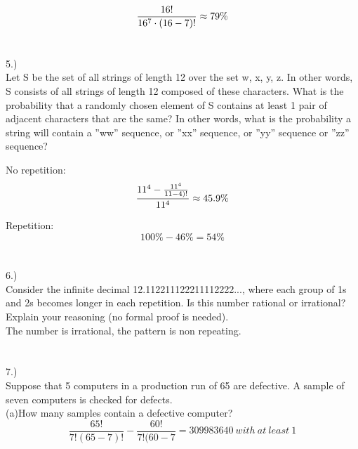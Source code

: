\documentclass[fleqn]{article}
\begin{document}
\begin{equation*}
  \frac{16!}{16^7 \cdot (16-7)!} \approx 79\%\\
\end{equation*}


\section*{}
5.)\\
Let S be the set of all strings of length 12 over the set {w, x, y, z}. 
In other words, S consists of all strings of
length 12 composed of these characters. What is the probability that 
a randomly chosen element of S contains at least 1 pair of adjacent 
characters that are the same? In other words, what is the probability a
string will contain a ”ww” sequence, or ”xx” sequence, or
”yy” sequence or ”zz” sequence?

No repetition:
\begin{equation*}
  \frac{11^4 - \frac{11^4}{11-4)!}}{11^4} \approx 45.9\% \\
\end{equation*}

Repetition:\\

\begin{equation*}
  100\%-46\%=54\%
\end{equation*}


 \section*{}
 6.) \\
Consider the infinite decimal 12.112211122211112222..., where each group 
of 1s and 2s becomes longer in each repetition. Is this number rational
or irrational? Explain your reasoning (no formal proof is needed).
\\
The number is irrational, the pattern is non repeating.

\section*{}
7.)\\
Suppose that 5 computers in a production run of 65 are defective. A sample of
seven computers is checked for defects.\\
(a)How many samples contain a defective computer?
\begin{equation*} 
  \frac{65!}{7!(65-7)!} - \frac{60!}{7!(60-7}=309983640~with~at~least~1 
\end{equation*}
\end{document}
